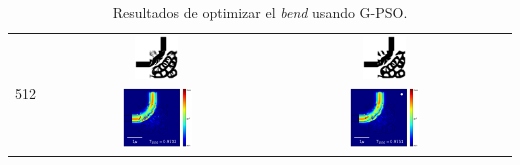 \begin{table}[ht]
\begin{tabular}{|c|c|c|c|}
    \hline
      \multirow{2}{*}{512} &
      \includegraphics[width=0.20\textwidth]{image/results/bend/PSO/visualize_eps_cont_512.png} &
      \includegraphics[width=0.20\textwidth]{image/results/bend/PSO/visualize_eps_disc_512.png} \\
      \cline{2-4}
      &
      \includegraphics[width=0.33\textwidth]{image/results/bend/PSO/visualize_field_cont_512.png} &
      \includegraphics[width=0.33\textwidth]{image/results/bend/PSO/visualize_field_disc_512.png} \\
    \hline
    \end{tabular}
    \hspace*{-3cm}
    \caption{Resultados de optimizar el \emph{bend} usando G-PSO.}
    \label{tab:opt-PSO-bend}
\end{table}

